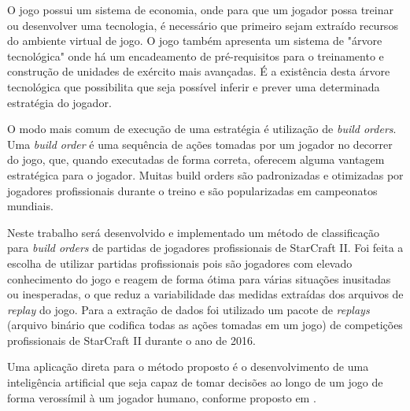 O jogo possui um sistema de economia, onde para que um jogador possa treinar ou desenvolver uma tecnologia, é necessário que primeiro sejam extraído recursos do ambiente virtual de jogo. O jogo também apresenta um sistema de "árvore tecnológica" onde há um encadeamento de pré-requisitos para o treinamento e construção de unidades de exército mais avançadas. É a existência desta árvore tecnológica que possibilita que seja possível inferir e prever uma determinada estratégia do jogador. 

O modo mais comum de execução de uma estratégia é utilização de \textit{build orders}. Uma \textit{build order} é uma sequência de ações tomadas por um jogador no decorrer do jogo, que, quando executadas de forma correta, oferecem alguma vantagem estratégica para o jogador. Muitas build orders são padronizadas e otimizadas por jogadores profissionais durante o treino e são popularizadas em campeonatos mundiais.

%

Neste trabalho será desenvolvido e implementado um método de classificação para \textit{build orders} de partidas de jogadores profissionais de StarCraft II. Foi feita a escolha de utilizar partidas profissionais pois são jogadores com elevado conhecimento do jogo e reagem de forma ótima para várias situações inusitadas ou inesperadas, o que reduz a variabilidade das medidas extraídas dos arquivos de \textit{replay} do jogo. Para a extração de dados foi utilizado um pacote de \textit{replays} (arquivo binário que codifica todas as ações tomadas em um jogo) de competições profissionais de StarCraft II durante o ano de 2016.


Uma aplicação direta para o método proposto é o desenvolvimento de uma inteligência artificial que seja capaz de tomar decisões ao longo de um jogo de forma verossímil à um jogador humano, conforme proposto em \cite{synnaeve2011bayesian1}.

